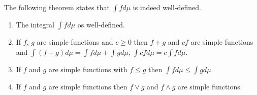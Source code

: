 The following theorem states that $\int fd\mu$ is indeed well-defined.





\begin{theorem}\label{thm:c7-1}
\begin{enumerate}
\item The integral $\int fd\mu$ os well-defined.
\item If $f$, $g$ are simple functions and $c\geq 0$ then $f+g$ and $cf$ are simple functions and $\int(f+g)d\mu=\int fd\mu+\int gd\mu$, $\int cfd\mu = c\int fd\mu$.
\item If $f$ and $g$ are simple functions with $f\leq g$ then $\int fd\mu\leq \int gd\mu$.
\item If $f$ and $g$ are simple functions then $f\vee g$ and $f\wedge g$ are simple functions.
\end{enumerate}
\end{theorem}



